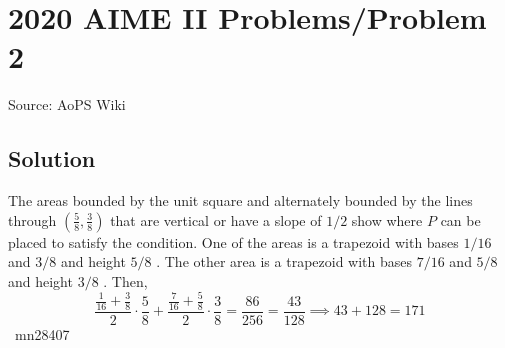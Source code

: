 \documentclass[12pt]{article}
\begin{document}
\section*{{2020 AIME II Problems/Problem 2}}
Source: AoPS Wiki

\subsection*{Solution}
The areas bounded by the unit square and alternately bounded by the lines through $\left(\frac{5}{8},\frac{3}{8}\right)$ that are vertical or have a slope of $1/2$ show where $P$ can be placed to satisfy the condition. One of the areas is a trapezoid with bases $1/16$ and $3/8$ and height $5/8$ . The other area is a trapezoid with bases $7/16$ and $5/8$ and height $3/8$ . Then, \[\frac{\frac{1}{16}+\frac{3}{8}}{2}\cdot\frac{5}{8}+\frac{\frac{7}{16}+\frac{5}{8}}{2}\cdot\frac{3}{8}=\frac{86}{256}=\frac{43}{128}\implies43+128=\boxed{171}\] ~mn28407
\end{document}
